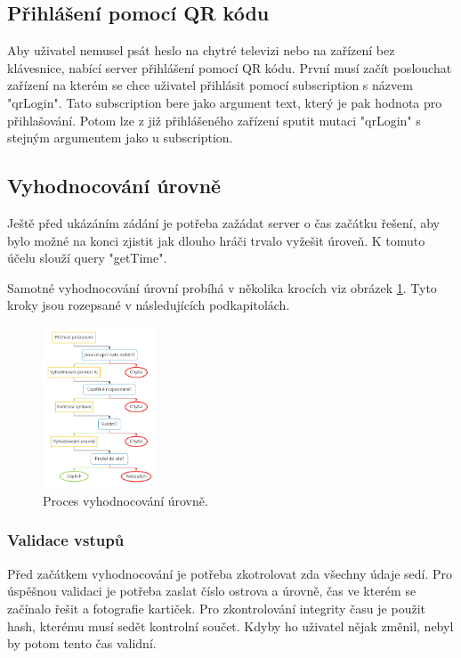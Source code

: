 \subsection{Přihlášení pomocí QR kódu}
Aby uživatel nemusel psát heslo na chytré televizi nebo na zařízení bez klávesnice, nabící server přihlášení pomocí QR kódu. První musí začít poslouchat zařízení na kterém se chce uživatel přihlásit pomocí subscription s názvem "qrLogin". Tato subscription bere jako argument text, který je pak hodnota pro přihlašování. Potom lze z již přihlášeného zařízení sputit mutaci "qrLogin" s stejným argumentem jako u subscription.

\subsection{Vyhodnocování úrovně}
Ještě před ukázáním zádání je potřeba zažádat server o čas začátku řešení, aby bylo možné na konci zjistit jak dlouho hráči trvalo vyžešit úroveň. K tomuto účelu slouží query "getTime".\par
Samotné vyhodnocování úrovní probíhá v několika krocích viz obrázek \ref{fig:proces-vyhodnocovani}. Tyto kroky jsou rozepsané v následujících podkapitolách.

\begin{figure}[h]
    \centering
    \includegraphics[width=0.3\textwidth]{img/proces.jpg}
    \caption{Proces vyhodnocování úrovně.}
    \label{fig:proces-vyhodnocovani}
\end{figure}

\subsubsection{Validace vstupů}
Před začátkem vyhodnocování je potřeba zkotrolovat zda všechny údaje sedí. Pro úspěšnou validaci je potřeba zaslat číslo ostrova a úrovně, čas ve kterém se začínalo řešit a fotografie kartiček. Pro zkontrolování integrity času je použit hash, kterému musí sedět kontrolní součet. Kdyby ho uživatel nějak změnil, nebyl by potom tento čas validní.

